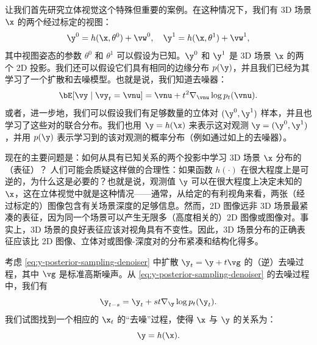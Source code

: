 \documentclass[../../book-main_zh.tex]{subfiles}
\begin{document}
让我们首先研究立体视觉这个特殊但重要的案例。在这种情况下，我们有 3D 场景 $\x$ 的两个经过标定的视图：
\begin{equation}
    \y^0 = h(\x, \theta^0) +\vw^0, \quad \y^1 = h(\x, \theta^1) +\vw^1,
\end{equation}
其中视图姿态的参数 $\theta^0$ 和 $\theta^1$ 可以假设为已知。$\y^0$ 和 $\y^1$ 是 3D 场景 $\x$ 的两个 2D 投影。我们还可以假设它们具有相同的边缘分布 $p(\y)$，并且我们已经为其学习了一个扩散和去噪模型。也就是说，我们知道去噪器：
\begin{equation}
    \bE[\vy \mid \vy_t=\vnu] =
    \vnu + t^2 \nabla_{\vnu}\log p_t(\vnu).
    \label{eq:y-posterior-sampling-denoiser}
\end{equation}
或者，进一步地，我们可以假设我们有足够数量的立体对 $(\y^0, \y^1)$ 样本，并且也学习了这些对的联合分布。我们也用 $\y = h(\x)$ 来表示这对观测 $\y = (\y^0, \y^1)$，并用 $p(\y)$ 表示学习到的该对观测的概率分布（例如通过如上的去噪器）。

现在的主要问题是：如何从具有已知关系的两个投影中学习 3D 场景 $\x$ 分布的（表征）？
人们可能会质疑这样做的合理性：如果函数 $h(\cdot)$ 在很大程度上是可逆的，为什么这是必要的？也就是说，观测值 $\y$ 可以在很大程度上决定未知的 $\x$，这在立体视觉中就是这种情况——通常，从给定的有利视角来看，两张（经过标定的）图像包含有关场景深度的足够信息。然而，2D 图像远非 3D 场景最紧凑的表征，因为同一个场景可以产生无限多（高度相关的）2D 图像或图像对。事实上，3D 场景的良好表征应该对视角具有不变性。因此，3D 场景分布的正确表征应该比 2D 图像、立体对或图像-深度对的分布紧凑和结构化得多。

考虑 \eqref{eq:y-posterior-sampling-denoiser} 中扩散 $\y_t =
\y + t\vg $ 的（逆）去噪过程，其中 $\vg$ 是标准高斯噪声。从 \eqref{eq:y-posterior-sampling-denoiser} 的去噪过程中，我们有
\begin{equation}
    \y_{t-s} =  \y_t + st \nabla_{\y} \log p_t(\y_t).
\end{equation}
我们试图找到一个相应的 $\x_t$ 的“去噪”过程，使得 $\x$ 与 $\y$ 的关系为：
\begin{equation}
    \y =  h(\x).
\end{equation}
\end{document}
